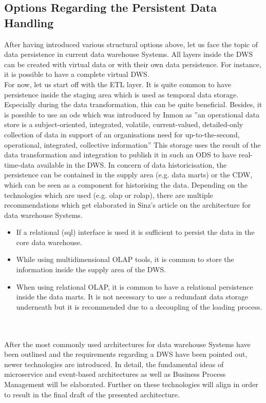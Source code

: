 \subsection{Options Regarding the Persistent Data Handling}
After having introduced various structural options above, let us face the topic of data persistence in current data warehouse Systems.
All layers inside the DWS can be created with virtual data or with their own data persistence. For instance, it is possible to have a complete virtual DWS. \cite{sinz}\newline
\\
For now, let us start off with the ETL layer. It is quite common to have persistence inside the staging area which is used as temporal data storage. Especially during the data transformation, this can be quite beneficial. Besides, it is possible to use an \acrfull{ods} which was introduced by Inmon as ''an operational data store is a subject-oriented, integrated, volatile, current-valued, detailed-only collection of data in support of an organisations need for up-to-the-second, operational, integrated, collective information'' \cite{buildingTheDWS} This storage uses the result of the data transformation and integration to publish it in such an ODS to have real-time-data available in the DWS.\newline
In concern of data historicisation, the persistence can be contained in the supply area (e.g. data marts) or the CDW, which can be seen as a component for historising the data. Depending on the technologies which are used (e.g. \acrshort{olap} or \acrshort{rolap}), there are multiple recommendations which get elaborated in Sinz's article on the architecture for data warehouse Systems.
\begin{itemize}
    \item If a relational (\acrshort{sql}) interface is used it is sufficient to persist the data in the core data warehouse.
    \item While using multidimensional OLAP tools, it is common to store the information inside the supply area of the DWS.
    \item When using relational OLAP, it is common to have a relational persistence inside the data marts. It is not necessary to use a redundant data storage underneath but it is recommended due to a decoupling of the loading process. 
\end{itemize}
\cite{sinz}
\\
\\
After the most commonly used architectures for data warehouse Systems have been outlined and the requirements regarding a DWS have been pointed out, newer technologies are introduced. In detail, the fundamental ideas of microservice and event-based architectures as well as Business Process Management will be elaborated. Further on these technologies will align in order to result in the final draft of the presented architecture.